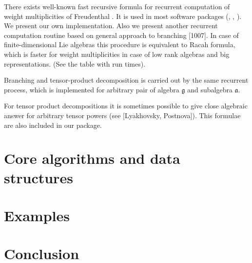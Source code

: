 \documentclass[12pt]{article}
\theoremstyle{definition}
\newcommand{\gf}{\mathfrak{g}}
\newcommand{\af}{\mathfrak{a}}
\begin{document}
There exists well-known fast recursive formula for recurrent computation of weight multiplicities of Freudenthal \cite{moody1982fast}. It is used in most software packages (\cite{vanleeuwen1994lsp}, \cite{stembridge2001computational}, \cite{fischbacher2002ilp}). We present our own implementation. Also we present another recurrent computation routine based on general approach to branching [1007]. In case of finite-dimensional Lie algebras this procedure is equivalent to Racah formula, which is faster for weight multiplicities in case of low rank algebras and big representations. (See the table with run times). 

Branching and tensor-product decomposition is carried out by the same recurrent process, which is implemented for arbitrary pair of algebra $\gf$ and subalgebra $\af$. 

For tensor product decompositions it is sometimes possible to give close algebraic answer for arbitrary tensor powers (see [Lyakhovsky, Postnova]). This formulae are also included in our package.

\section{Core algorithms and data structures}
\label{sec:core-algorithms}

\section{Examples}
\label{sec:examples}

\section{Conclusion}
\label{sec:conclusion}



{}

\end{document}
